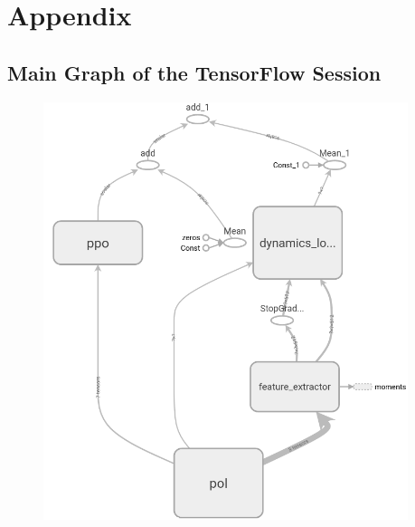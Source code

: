 \documentclass[draft,final]{vutinfth} %
\begin{document}
    \printindex

    \printglossaries

    
    


    \chapter*{Appendix}\label{ch:appendix}
    \section*{Main Graph of the TensorFlow Session}
    \begin{figure}[H]
        \centering
        \includegraphics[width=0.95\textwidth]{figures/main_graph.png}
    \end{figure}
    \newpage
\end{document}
